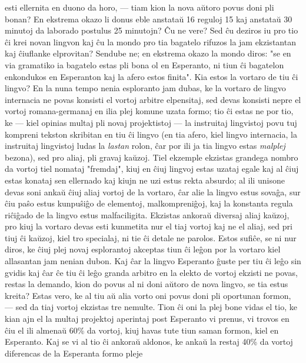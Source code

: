 esti ellernita en duono da horo, --- tiam kion la nova a\u utoro
povus doni pli bonan? En ekstrema okazo li donus eble anstata\u u 16
reguloj 15 kaj anstata\u u 30 minutoj da laborado postulus 25
minutojn? \^Cu ne vere? Sed \^cu deziros iu pro tio \^ci krei novan
lingvon kaj \^cu la mondo pro tia bagatelo rifuzos la jam
ekzistantan kaj \^ciuflanke elprovitan? Sendube ne; en ekstrema
okazo la mondo diros: "se en via gramatiko ia bagatelo estas pli
bona ol en Esperanto, ni tiun \^ci bagatelon enkondukos en
Esperanton kaj la afero estos finita". Kia estos la vortaro de tiu
\^ci lingvo? En la nuna tempo nenia esploranto jam dubas, ke la
vortaro de lingvo internacia ne povas konsisti el vortoj arbitre
elpensitaj, sed devas konsisti nepre el vortoj romana-germanaj en
ilia plej komune uzata formo; tio \^ci estas ne por tio, ke --- kiel
opinias multaj pli novaj projektistoj
--- la instruitaj lingvistoj povu tuj kompreni tekston skribitan en
tiu \^ci lingvo (en tia afero, kiel lingvo internacia, la instruitaj
lingvistoj ludas la {\sl lastan} rolon, \^car por ili ja tia lingvo
estas {\sl malplej} bezona), sed pro aliaj, pli gravaj ka\u uzoj.
Tiel ekzemple ekzistas grandega nombro da vortoj tiel nomataj
"fremdaj", kiuj en \^ciuj lingvoj estas uzataj egale kaj al \^ciuj
estas konataj sen ellernado kaj kiujn ne uzi estus rekta absurdo; al
ili unisone devas soni anka\u u \^ciuj aliaj vortoj de la vortaro,
\^car alie la lingvo estus sova\^ga, sur \^ciu pa\^so estus
kunpu\^si\^go de elementoj, malkompreni\^goj, kaj la konstanta
regula ri\^ci\^gado de la lingvo estus malfaciligita. Ekzistas
ankora\u u diversaj aliaj ka\u uzoj, pro kiuj la vortaro devas esti
kunmetita nur el tiaj vortoj kaj ne el aliaj, sed pri tiuj \^ci ka\u
uzoj, kiel tro specialaj, ni tie \^ci detale ne parolos. Estos
sufi\^ce, se ni nur diros, ke \^ciuj plej novaj esplorantoj akceptas
tiun \^ci le\^gon por la vortaro kiel allasantan jam nenian dubon.
Kaj \^car la lingvo Esperanto \^guste per tiu \^ci le\^go sin gvidis
kaj \^car \^ce tiu \^ci le\^go granda arbitro en la elekto de vortoj
ekzisti ne povas, restas la demando, kion do povus al ni doni a\u
utoro de nova lingvo, se tia estus kreita? Estas vero, ke al tiu a\u
u alia vorto oni povus doni pli oportunan formon, --- sed da tiaj
vortoj ekzistas tre nemulte. Tion \^ci oni la plej bone vidas el
tio, ke kian ajn el la multaj projektoj aperintaj post Esperanto vi
prenus, vi
trovos en \^ciu el ili almena\u u 60\% da vortoj, kiuj havas tute tiun saman
formon, kiel en Esperanto. Kaj se vi al tio \^ci ankora\u u aldonos,
ke
anka\u u la restaj 40\% da vortoj diferencas de la Esperanta formo pleje
